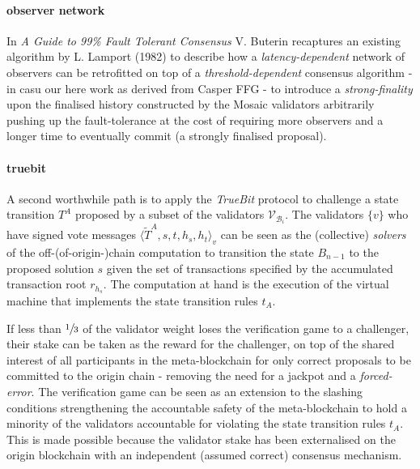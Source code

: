 \documentclass[12pt,a4paper]{article}
\begin{document}
\paragraph{observer network} In \textit{A Guide to 99\% Fault Tolerant Consensus}\cite{honestobserver} V. Buterin recaptures an existing algorithm by L. Lamport (1982) to describe how a \emph{latency-dependent} network of observers can be retrofitted on top of a \emph{threshold-dependent} consensus algorithm - in casu our here work as derived from Casper FFG - to introduce a \emph{strong-finality} upon the finalised history constructed by the Mosaic validators arbitrarily pushing up the fault-tolerance at the cost of requiring more observers and a longer time to eventually commit (a strongly finalised proposal).

\paragraph{truebit} A second worthwhile path is to apply the \textit{TrueBit}\cite{truebit} protocol to challenge a state transition $T^A$ proposed by a subset of the validators $\mathcal{V}_{\mathcal{B}_i}$.
The validators $\{v\}$ who have signed vote messages $\langle\tilde{T}^A, s, t, h_s, h_t\rangle_v$ can be seen as the (collective) \emph{solvers} of the off-(of-origin-)chain computation to transition the state $B_{n-1}$ to the proposed solution $s$ given the set of transactions specified by the accumulated transaction root $r_{h_s}$.
The computation at hand is the execution of the virtual machine that implements the state transition rules $t_A$.

If less than $\sfrac{1}{3}$ of the validator weight loses the verification game to a challenger, their stake can be taken as the reward for the challenger, on top of the shared interest of all participants in the meta-blockchain for only correct proposals to be committed to the origin chain - removing the need for a jackpot and a \emph{forced-error}.
The verification game can be seen as an extension to the slashing conditions strengthening the accountable safety of the meta-blockchain to hold a minority of the validators accountable for violating the state transition rules $t_A$.
This is made possible because the validator stake has been externalised on the origin blockchain with an independent (assumed correct) consensus mechanism.
\end{document}
